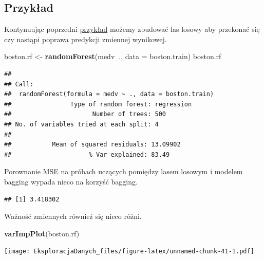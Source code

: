 \documentclass[]{book}
\newenvironment{Shaded}{\begin{snugshade}}{\end{snugshade}}
\newcommand{\DataTypeTok}[1]{\textcolor[rgb]{0.13,0.29,0.53}{#1}}
\newcommand{\KeywordTok}[1]{\textcolor[rgb]{0.13,0.29,0.53}{\textbf{#1}}}
\newcommand{\NormalTok}[1]{#1}
\newcommand{\OperatorTok}[1]{\textcolor[rgb]{0.81,0.36,0.00}{\textbf{#1}}}
\newcommand{\StringTok}[1]{\textcolor[rgb]{0.31,0.60,0.02}{#1}}
\theoremstyle{plain}
\theoremstyle{definition}
\begin{document}
\hypertarget{przyk52}{%
\subsection{Przykład}\label{przyk52}}

Kontynuując poprzedni \protect\hyperlink{przyk51}{przykład} możemy zbudować las losowy aby przekonać się czy nastąpi poprawa predykcji zmiennej wynikowej.

\begin{Shaded}
\begin{Highlighting}[]
\NormalTok{boston.rf <-}\StringTok{ }\KeywordTok{randomForest}\NormalTok{(medv}\OperatorTok{~}\NormalTok{., }\DataTypeTok{data =}\NormalTok{ boston.train)}
\NormalTok{boston.rf}
\end{Highlighting}
\end{Shaded}

\begin{verbatim}
## 
## Call:
##  randomForest(formula = medv ~ ., data = boston.train) 
##                Type of random forest: regression
##                      Number of trees: 500
## No. of variables tried at each split: 4
## 
##           Mean of squared residuals: 13.09902
##                     % Var explained: 83.49
\end{verbatim}

Porownanie MSE na próbach uczących pomiędzy lasem losowym i modelem bagging wypada nieco na korzyść bagging.

\begin{Shaded}
\end{Shaded}

\begin{verbatim}
## [1] 3.418302
\end{verbatim}

Ważność zmiennych również się nieco różni.

\begin{Shaded}
\begin{Highlighting}[]
\KeywordTok{varImpPlot}\NormalTok{(boston.rf)}
\end{Highlighting}
\end{Shaded}

\texttt{[image: EksploracjaDanych\_files/figure-latex/unnamed-chunk-41-1.pdf]}
\end{document}
